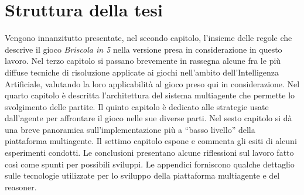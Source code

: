 \section{Struttura della tesi}

Vengono innanzitutto presentate, nel secondo capitolo, l'insieme delle regole che descrive il gioco \emph{Briscola in 5} nella versione presa in considerazione in questo lavoro.
Nel terzo capitolo si passano brevemente in rassegna alcune fra le più diffuse tecniche di risoluzione applicate ai giochi nell'ambito dell'Intelligenza Artificiale, valutando la loro applicabilità al gioco preso qui in considerazione.
Nel quarto capitolo è descritta l'architettura del sistema multiagente che permette lo svolgimento delle partite.
Il quinto capitolo è dedicato alle strategie usate dall'agente per affrontare il gioco nelle sue diverse parti.
Nel sesto capitolo si dà una breve panoramica sull'implementazione più a ``basso livello'' della piattaforma multiagente.
Il settimo capitolo espone e commenta gli esiti di alcuni esperimenti condotti.
Le conclusioni presentano alcune riflessioni sul lavoro fatto così come spunti per possibili sviluppi.
Le appendici forniscono qualche dettaglio sulle tecnologie utilizzate per lo sviluppo della piattaforma multiagente e del reasoner.
